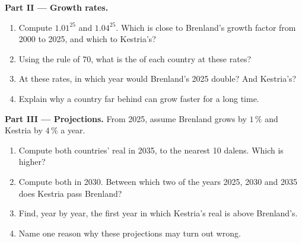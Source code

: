 \begin{problem}
\medskip
\noindent\textbf{Part II --- Growth rates.}
\begin{enumerate}[resume]
  \item Compute $1.01^{25}$ and $1.04^{25}$. Which is close to Brenland's growth factor from 2000 to
        2025, and which to Kestria's?
  \item Using the rule of 70, what is the  of each country at these rates?
  \item At these rates, in which year would Brenland's 2025  double? And Kestria's?
  \item Explain why a country far behind can grow faster for a long time.
\end{enumerate}

\medskip
\noindent\textbf{Part III --- Projections.} From 2025, assume Brenland grows by $1\,\%$ and Kestria by
$4\,\%$ a year.
\begin{enumerate}[resume]
  \item Compute both countries' real  in 2035, to the nearest 10 dalens. Which is
        higher?
  \item Compute both in 2030. Between which two of the years 2025, 2030 and 2035 does Kestria pass
        Brenland?
  \item Find, year by year, the first year in which Kestria's real  is above
        Brenland's.
  \item Name one reason why these projections may turn out wrong.
\end{enumerate}
\end{problem}
